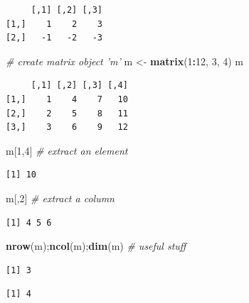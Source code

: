 \documentclass[
]{book}
\newenvironment{Shaded}{\begin{snugshade}}{\end{snugshade}}
\newcommand{\CommentTok}[1]{\textcolor[rgb]{0.56,0.35,0.01}{\textit{#1}}}
\newcommand{\DecValTok}[1]{\textcolor[rgb]{0.00,0.00,0.81}{#1}}
\newcommand{\KeywordTok}[1]{\textcolor[rgb]{0.13,0.29,0.53}{\textbf{#1}}}
\newcommand{\NormalTok}[1]{#1}
\newcommand{\OperatorTok}[1]{\textcolor[rgb]{0.81,0.36,0.00}{\textbf{#1}}}
\newcommand{\StringTok}[1]{\textcolor[rgb]{0.31,0.60,0.02}{#1}}
\begin{document}
\begin{verbatim}
     [,1] [,2] [,3]
[1,]    1    2    3
[2,]   -1   -2   -3
\end{verbatim}

\begin{Shaded}
\begin{Highlighting}[]
\CommentTok{# create matrix object 'm'}
\NormalTok{m <-}\StringTok{ }\KeywordTok{matrix}\NormalTok{(}\DecValTok{1}\OperatorTok{:}\DecValTok{12}\NormalTok{, }\DecValTok{3}\NormalTok{, }\DecValTok{4}\NormalTok{)}
\NormalTok{m}
\end{Highlighting}
\end{Shaded}

\begin{verbatim}
     [,1] [,2] [,3] [,4]
[1,]    1    4    7   10
[2,]    2    5    8   11
[3,]    3    6    9   12
\end{verbatim}

\begin{Shaded}
\begin{Highlighting}[]
\NormalTok{m[}\DecValTok{1}\NormalTok{,}\DecValTok{4}\NormalTok{] }\CommentTok{# extract an element}
\end{Highlighting}
\end{Shaded}

\begin{verbatim}
[1] 10
\end{verbatim}

\begin{Shaded}
\begin{Highlighting}[]
\NormalTok{m[,}\DecValTok{2}\NormalTok{]  }\CommentTok{# extract a column}
\end{Highlighting}
\end{Shaded}

\begin{verbatim}
[1] 4 5 6
\end{verbatim}

\begin{Shaded}
\begin{Highlighting}[]
\KeywordTok{nrow}\NormalTok{(m);}\KeywordTok{ncol}\NormalTok{(m);}\KeywordTok{dim}\NormalTok{(m) }\CommentTok{# useful stuff}
\end{Highlighting}
\end{Shaded}

\begin{verbatim}
[1] 3
\end{verbatim}

\begin{verbatim}
[1] 4
\end{verbatim}
\end{document}
